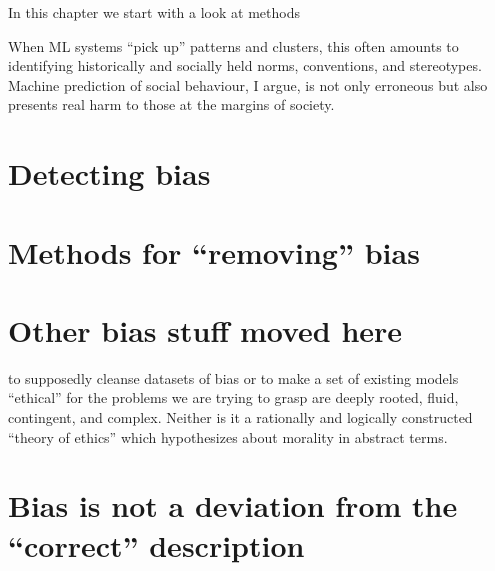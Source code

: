 
In this chapter we start with a look at methods

When ML systems ``pick up'' patterns and clusters, this often amounts to identifying historically and socially held norms, conventions, and stereotypes. Machine prediction of social behaviour, I argue, is not only erroneous but also presents real harm to those at the margins of society.




\section{Detecting bias}





\section{Methods for ``removing'' bias}



\section{Other bias stuff moved here}


to supposedly cleanse datasets of bias or to make a set of existing models ``ethical'' for the problems we are trying to grasp are deeply rooted, fluid, contingent, and complex. Neither is it a rationally and logically constructed ``theory of ethics'' which hypothesizes about morality in abstract terms. 


\section{Bias is not a deviation from the ``correct'' description}
\label{bias is not a deviation}

